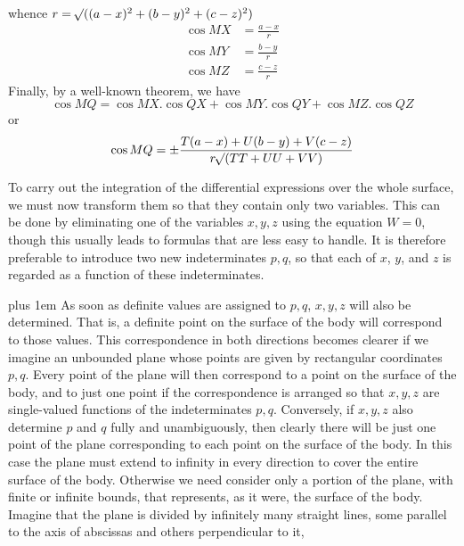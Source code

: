whence $r=\mathord{{}^{}\!\surd}((a-x)^2+(b-y)^2+(c-z)^2)$
\[
\begin{aligned}
\cos MX&=\frac{a-x}{r}\\
\cos MY&=\frac{b-y}{r}\\
\cos MZ&=\frac{c-z}{r}
\end{aligned}
\]
Finally, by a well-known theorem, we have
\[
\cos MQ=\cos MX.\cos QX+\cos MY.\cos QY+\cos MZ.\cos QZ
\]
or
\[
\cos MQ=\pm\frac{T(a-x)+U(b-y)+V(c-z)}{r\mathord{{}^{}\!\surd}(TT+UU+VV)}
\]

\par
To carry out the integration of the differential expressions over the whole surface, we must now transform them so that they contain only two variables. This can be done by eliminating one of the variables $x,y,z$ using the equation $W=0$, though this usually leads to formulas that are less easy to handle. It is therefore preferable to introduce two new indeterminates $p,q$, so that each of $x$, $y$, and $z$ is regarded as a function of these indeterminates.

\begingroup\rightskip=0pt plus 1em
As soon as definite values are assigned to $p,q$, $x,y,z$ will also be determined. That is, a definite point on the surface of the body will correspond to those values. This correspondence in both directions becomes clearer if we imagine an unbounded plane whose points are given by rectangular coordinates $p,q$. Every point of the plane will then correspond to a point on the surface of the body, and to just one point if the correspondence is arranged so that $x,y,z$ are single-valued functions of the indeterminates $p,q$. Conversely, if $x,y,z$ also determine $p$ and $q$ fully and unambiguously, then clearly there will be just one point of the plane corresponding to each point on the surface of the body. In this case the plane must extend to infinity in every direction to cover the entire surface of the body. Otherwise we need consider only a portion of the plane, with finite or infinite bounds, that represents, as it were, the surface of the body. Imagine that the plane is divided by infinitely many straight lines, some parallel to the axis of abscissas and others perpendicular to it,
